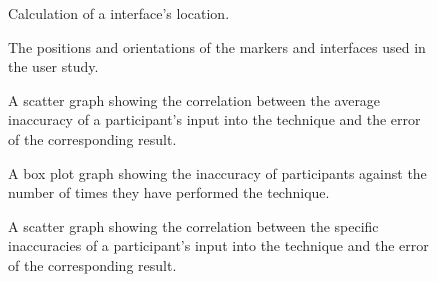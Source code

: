 \documentclass{bmcart}
\begin{document}
\begin{backmatter}
\begin{figure}[h!]
   \centering
   \caption{
   Calculation of a interface's location.}
   \label{fig:trig}
\end{figure}

\begin{figure}[h!]
  \centering
   \caption{
   The positions and orientations of the markers and interfaces used in the user study.}
   \label{fig:room}
\end{figure}

\begin{figure}[h!]
   \centering
   \caption{
   A scatter graph showing the correlation between the average inaccuracy of a participant's input into the technique and the error of the corresponding result.}
   \label{fig:scatterAverage}
\end{figure}

\begin{figure}[h!]
   \centering
   \caption{
   A box plot graph showing the inaccuracy of participants against the number of times they have performed the technique.}
   \label{fig:boxPlot}
\end{figure}

\begin{figure}[h!]
   \centering
   \caption{
   A scatter graph showing the correlation between the specific inaccuracies of a participant's input into the technique and the error of the corresponding result.}
   \label{fig:scatterIndividual}
\end{figure}




\end{backmatter}
\end{document}

